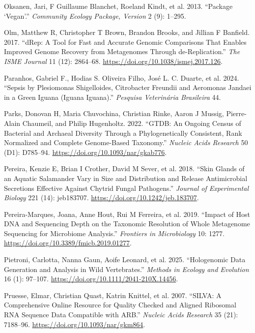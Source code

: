 \documentclass[
  12pt,
]{article}
\newlength{\cslhangindent}
\newenvironment{CSLReferences}[2] %
 {\begin{list}{}{%
  \setlength{\itemindent}{0pt}
  \setlength{\leftmargin}{0pt}
  \setlength{\parsep}{0pt}
  \ifodd #1
   \setlength{\leftmargin}{\cslhangindent}
   \setlength{\itemindent}{-1\cslhangindent}
  \fi
  \setlength{\itemsep}{#2\baselineskip}}}
 {\end{list}}
\begin{document}
\begin{CSLReferences}{1}{1}
{Oksanen, Jari, F Guillaume Blanchet, Roeland Kindt, et al.} 2013.
{``Package {`Vegan'}.''} \emph{Community Ecology Package, Version} 2
(9): 1--295.

Olm, Matthew R, Christopher T Brown, Brandon Brooks, and Jillian F
Banfield. 2017. {``{dRep}: A Tool for Fast and Accurate Genomic
Comparisons That Enables Improved Genome Recovery from Metagenomes
Through de-Replication.''} \emph{The ISME Journal} 11 (12): 2864--68.
\url{https://doi.org/10.1038/ismej.2017.126}.

Paranhos, Gabriel F., Hodias S. Oliveira Filho, José L. C. Duarte, et
al. 2024. {``Sepsis by {Plesiomonas} Shigelloides, {Citrobacter}
Freundii and {Aeromonas} Jandaei in a Green Iguana ({Iguana} Iguana).''}
\emph{Pesquisa Veterinária Brasileira} 44.

Parks, Donovan H, Maria Chuvochina, Christian Rinke, Aaron J Mussig,
Pierre-Alain Chaumeil, and Philip Hugenholtz. 2022. {``{GTDB}: An
Ongoing Census of Bacterial and Archaeal Diversity Through a
Phylogenetically Consistent, Rank Normalized and Complete Genome-Based
Taxonomy.''} \emph{Nucleic Acids Research} 50 (D1): D785--94.
\url{https://doi.org/10.1093/nar/gkab776}.

Pereira, Kenzie E, Brian I Crother, David M Sever, et al. 2018. {``Skin
Glands of an Aquatic Salamander Vary in Size and Distribution and
Release Antimicrobial Secretions Effective Against Chytrid Fungal
Pathogens.''} \emph{Journal of Experimental Biology} 221 (14):
jeb183707. \url{https://doi.org/10.1242/jeb.183707}.

Pereira-Marques, Joana, Anne Hout, Rui M Ferreira, et al. 2019.
{``Impact of Host {DNA} and Sequencing Depth on the Taxonomic Resolution
of Whole Metagenome Sequencing for Microbiome Analysis.''}
\emph{Frontiers in Microbiology} 10: 1277.
\url{https://doi.org/10.3389/fmicb.2019.01277}.

Pietroni, Carlotta, Nanna Gaun, Aoife Leonard, et al. 2025.
{``Hologenomic Data Generation and Analysis in Wild Vertebrates.''}
\emph{Methods in Ecology and Evolution} 16 (1): 97--107.
\url{https://doi.org/10.1111/2041-210X.14456}.

Pruesse, Elmar, Christian Quast, Katrin Knittel, et al. 2007.
{``{SILVA}: A Comprehensive Online Resource for Quality Checked and
Aligned Ribosomal {RNA} Sequence Data Compatible with {ARB}.''}
\emph{Nucleic Acids Research} 35 (21): 7188--96.
\url{https://doi.org/10.1093/nar/gkm864}.


\end{CSLReferences}
\end{document}
